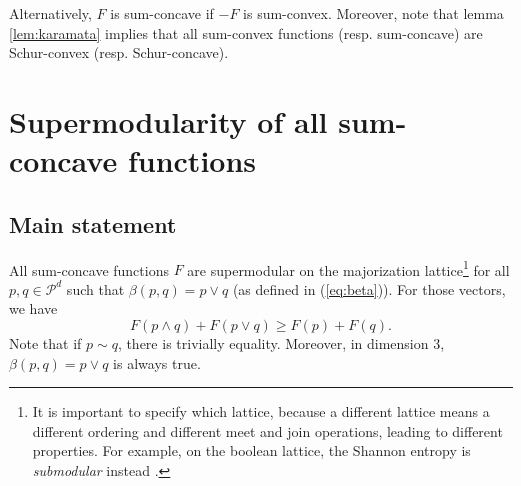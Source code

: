 \noindent Alternatively, $F$ is sum-concave if $-F$ is sum-convex. Moreover, note that lemma \ref{lem:karamata} implies that all sum-convex functions (resp. sum-concave) are Schur-convex (resp. Schur-concave).



\section{Supermodularity of all sum-concave functions} \label{sec:alternative_supermodularity}

\subsection{Main statement}

\begin{theorem} \label{th:alternative_supermodularity}
    All sum-concave functions $F$ are supermodular on the majorization lattice\footnote{It is important to specify which lattice, because a different lattice means a different ordering and different meet and join operations, leading to different properties. For example, on the boolean lattice, the Shannon entropy is \textit{submodular} instead \cite{cicalese_supermodularity_2002}.} for all $p, q \in \mathcal{P}^d$ such that $\beta(p, q) = p \vee q$ (as defined in (\ref{eq:beta})). For those vectors, we have
    \begin{equation} \label{eq:supermodularity}
        F(p \wedge q) + F(p \vee q) \geq F(p) + F(q).
    \end{equation}
    Note that if $p \sim q$, there is trivially equality. Moreover, in dimension 3, $\beta(p, q) = p \vee q$ is always true.
\end{theorem}

